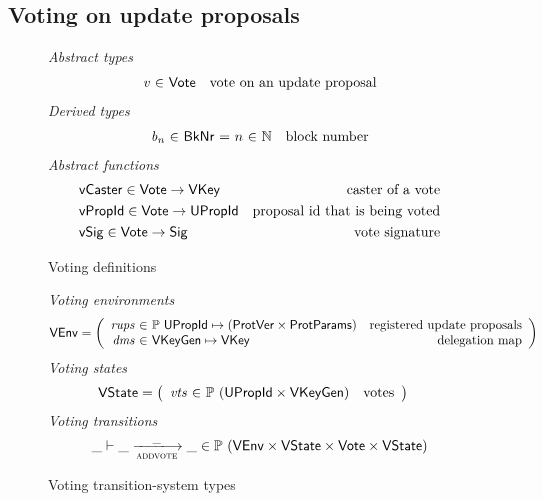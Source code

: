 \clearpage

\subsection{Voting on update proposals}
\label{sec:voting-on-update-proposals}

\begin{figure}[htb]
  \emph{Abstract types}
  \begin{equation*}
    \begin{array}{r@{~\in~}lr}
      \var{v} & \Vote & \text{vote on an update proposal}
    \end{array}
  \end{equation*}
  \emph{Derived types}
  \begin{equation*}
    \begin{array}{r@{~\in~}l@{~=~}r@{~\in~}lr}
      \var{b_n} & \BkNr & n & \mathbb{N} & \text{block number}
    \end{array}
  \end{equation*}
  \emph{Abstract functions}
  \begin{align*}
    & \mathsf{vCaster} \in \mathsf{Vote} \to \mathsf{VKey} & \text{caster of a vote}\\
    & \mathsf{vPropId} \in \mathsf{Vote} \to \mathsf{UPropId} & \text{proposal id that is being voted}\\
    & \mathsf{vSig} \in \mathsf{Vote} \to \mathsf{Sig} & \text{vote signature}
  \end{align*}
  \caption{Voting definitions}
  \label{fig:defs:voting}
\end{figure}

\begin{figure}[htb]
  \emph{Voting environments}
  \begin{align*}
    & \VEnv
      = \left(
      \begin{array}{r@{~\in~}lr}
        \var{rups} & \powerset{\UPropId \mapsto (\ProtVer \times \ProtParams)}
        & \text{registered update proposals}\\
        \var{dms} & \VKeyGen \mapsto \VKey & \text{delegation map}
      \end{array}\right)
  \end{align*}
  \emph{Voting states}
  \begin{align*}
    & \VState
      = \left(
      \begin{array}{r@{~\in~}lr}
        \var{vts} & \powerset{(\UPropId \times \VKeyGen)} & \text{votes}
      \end{array}\right)
  \end{align*}
  \emph{Voting transitions}
    \begin{equation*}
    \_ \vdash \_ \trans{addvote}{\_} \_ \in
    \powerset (\VEnv \times \VState \times \Vote \times \VState)
    \end{equation*}
  \caption{Voting transition-system types}
  \label{fig:ts-types:voting}
\end{figure}

